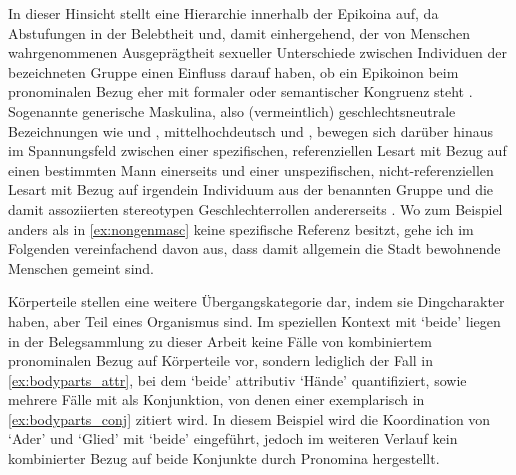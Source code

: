 In dieser Hinsicht stellt \citet[172--174]{klein2022} eine Hierarchie innerhalb
der Epikoina auf, da Abstufungen in der Belebtheit und, damit einhergehend, der
von Menschen wahrgenommenen Ausgeprägtheit sexueller Unterschiede zwischen
Individuen der bezeichneten Gruppe einen Einfluss darauf haben, ob ein
Epikoinon beim pronominalen Bezug eher mit formaler oder semantischer Kongruenz
steht \autocite[vgl.~auch][74--83]{kotthoffnuebling2018}. Sogenannte generische
Maskulina, also (vermeintlich) geschlechtsneutrale Bezeichnungen wie
 und , mittelhochdeutsch  und ,
bewegen sich darüber hinaus im Spannungsfeld zwischen einer spezifischen,
referenziellen Lesart mit Bezug auf einen bestimmten Mann einerseits und einer
unspezifischen, nicht-referenziellen Lesart mit Bezug auf irgendein Individuum
aus der benannten Gruppe und die damit assoziierten stereotypen
Geschlechterrollen andererseits
\autocites[91--122]{kotthoffnuebling2018}[159--160, 179--180]{klein2022}. Wo
zum Beispiel  anders als in \cref{ex:nongenmasc} keine
spezifische Referenz besitzt, gehe ich im Folgenden vereinfachend davon aus,
dass damit allgemein die Stadt bewohnende Menschen gemeint sind.


Körperteile stellen eine weitere Übergangskategorie dar, indem sie
Dingcharakter haben, aber Teil eines Organismus sind. Im speziellen Kontext mit
 `beide' liegen in der Belegsammlung zu dieser Arbeit keine
Fälle von kombiniertem pronominalen Bezug auf Körperteile vor, sondern
lediglich der Fall in \cref{ex:bodyparts_attr}, bei dem 
`beide' attributiv  `Hände' quantifiziert, sowie mehrere
Fälle mit  als Konjunktion, von denen einer exemplarisch in
\cref{ex:bodyparts_conj} zitiert wird. In diesem Beispiel wird die Koordination
von  `Ader' und  `Glied' mit 
`beide' eingeführt, jedoch im weiteren Verlauf kein kombinierter Bezug auf
beide Konjunkte durch Pronomina hergestellt.

